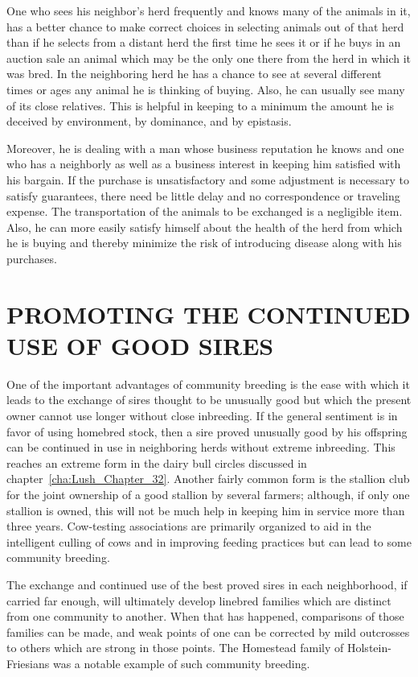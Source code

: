 One who sees his neighbor's herd frequently and knows many of the
animals in it, has a better chance to make correct choices in selecting
animals out of that herd than if he selects from a distant herd the first
time he sees it or if he buys in an auction sale an animal which may be
the only one there from the herd in which it was bred. In the neighboring
herd he has a chance to see at several different times or ages any
animal he is thinking of buying. Also, he can usually see many of its
close relatives. This is helpful in keeping to a minimum the amount he
is deceived by environment, by dominance, and by epistasis.

Moreover, he is dealing with a man whose business reputation he
knows and one who has a neighborly as well as a business interest in
keeping him satisfied with his bargain. If the purchase is unsatisfactory
and some adjustment is necessary to satisfy guarantees, there need be
little delay and no correspondence or traveling expense. The transportation
of the animals to be exchanged is a negligible item. Also, he can
more easily satisfy himself about the health of the herd from which he is
buying and thereby minimize the risk of introducing disease along with
his purchases.

\section*{PROMOTING THE CONTINUED USE OF GOOD SIRES}

One of the important advantages of community breeding is the ease
with which it leads to the exchange of sires thought to be unusually
good but which the present owner cannot use longer without close
inbreeding. If the general sentiment is in favor of using homebred
stock, then a sire proved unusually good by his offspring can be continued
in use in neighboring herds without extreme inbreeding. This
reaches an extreme form in the dairy bull circles discussed in
chapter~\ref{cha:Lush_Chapter_32}. Another fairly common form is the
stallion club for the joint ownership of a good stallion by several
farmers; although, if only one stallion is owned, this will not be much
help in keeping him in service more than three years. Cow-testing
associations are primarily organized to aid in the intelligent culling
of cows and in improving feeding practices but can lead to some community
breeding.

The exchange and continued use of the best proved sires in each
neighborhood, if carried far enough, will ultimately develop linebred
families which are distinct from one community to another. When that
has happened, comparisons of those families can be made, and weak
points of one can be corrected by mild outcrosses to others which are
strong in those points. The Homestead family of Holstein-Friesians was
a notable example of such community breeding.

